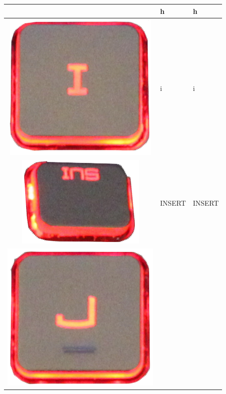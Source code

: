 \begin{longtable}{|cll|}
\begin{minipage}[c]{.3\textwidth}
\vspace{0.2cm}
\end{minipage} & h & h\\
\hline
\begin{minipage}[c]{.3\textwidth}
\vspace{0.2cm}
\includegraphics[scale=0.06]{Images/KeyMapping/i}
\vspace{0.2cm}
\end{minipage} & i & i\\
\hline
\begin{minipage}[c]{.3\textwidth}
\vspace{0.2cm}
\includegraphics[scale=0.06]{Images/KeyMapping/INSERT}
\vspace{0.2cm}
\end{minipage} & INSERT & INSERT\\
\hline
\begin{minipage}[c]{.3\textwidth}
\vspace{0.2cm}
\includegraphics[scale=0.06]{Images/KeyMapping/j}

\end{minipage}
\end{longtable}
